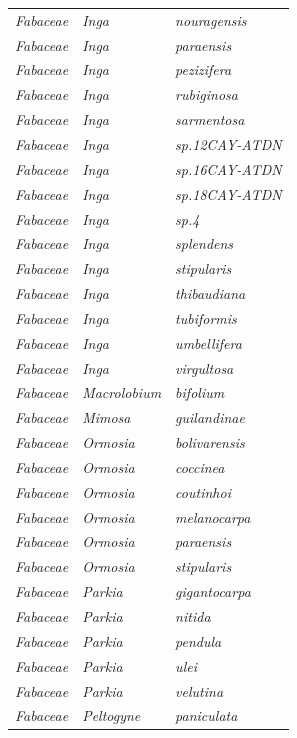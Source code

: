 \documentclass[fleqn,10pt]{ArtEcoFoG} %
\begin{document}
\begin{table}[t]
\begin{tabular}{lll}
\addlinespace
\em{Fabaceae} & \em{Inga} & \em{nouragensis}\\
\em{Fabaceae} & \em{Inga} & \em{paraensis}\\
\em{Fabaceae} & \em{Inga} & \em{pezizifera}\\
\em{Fabaceae} & \em{Inga} & \em{rubiginosa}\\
\em{Fabaceae} & \em{Inga} & \em{sarmentosa}\\
\addlinespace
\em{Fabaceae} & \em{Inga} & \em{sp.12CAY-ATDN}\\
\em{Fabaceae} & \em{Inga} & \em{sp.16CAY-ATDN}\\
\em{Fabaceae} & \em{Inga} & \em{sp.18CAY-ATDN}\\
\em{Fabaceae} & \em{Inga} & \em{sp.4}\\
\em{Fabaceae} & \em{Inga} & \em{splendens}\\
\addlinespace
\em{Fabaceae} & \em{Inga} & \em{stipularis}\\
\em{Fabaceae} & \em{Inga} & \em{thibaudiana}\\
\em{Fabaceae} & \em{Inga} & \em{tubiformis}\\
\em{Fabaceae} & \em{Inga} & \em{umbellifera}\\
\em{Fabaceae} & \em{Inga} & \em{virgultosa}\\
\addlinespace
\em{Fabaceae} & \em{Macrolobium} & \em{bifolium}\\
\em{Fabaceae} & \em{Mimosa} & \em{guilandinae}\\
\em{Fabaceae} & \em{Ormosia} & \em{bolivarensis}\\
\em{Fabaceae} & \em{Ormosia} & \em{coccinea}\\
\em{Fabaceae} & \em{Ormosia} & \em{coutinhoi}\\
\addlinespace
\em{Fabaceae} & \em{Ormosia} & \em{melanocarpa}\\
\em{Fabaceae} & \em{Ormosia} & \em{paraensis}\\
\em{Fabaceae} & \em{Ormosia} & \em{stipularis}\\
\em{Fabaceae} & \em{Parkia} & \em{gigantocarpa}\\
\em{Fabaceae} & \em{Parkia} & \em{nitida}\\
\addlinespace
\em{Fabaceae} & \em{Parkia} & \em{pendula}\\
\em{Fabaceae} & \em{Parkia} & \em{ulei}\\
\em{Fabaceae} & \em{Parkia} & \em{velutina}\\
\em{Fabaceae} & \em{Peltogyne} & \em{paniculata}\\

\end{tabular}
\end{table}
\end{document}
